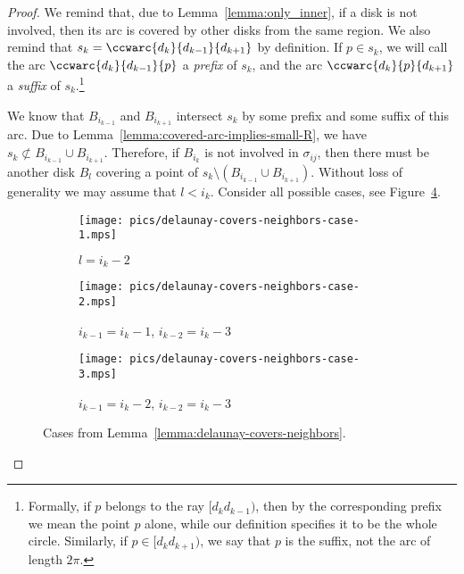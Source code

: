 \begin{appendices}
\begin{proof}
We remind that, due to Lemma~\ref{lemma:only_inner}, if a disk is not involved, then its arc is covered by other disks from the same region. We also remind that $s_k = \ccwarc{d_k}{d_{k-1}}{d_{k+1}}$ by definition. If $p\in s_k$, we will call the arc $\ccwarc{d_k}{d_{k-1}}{p}$ a \emph{prefix} of $s_k$, and the arc $\ccwarc{d_k}{p}{d_{k+1}}$ a \emph{suffix} of $s_k$.\footnote{Formally, if $p$ belongs to the ray $[d_kd_{k-1})$, then by the corresponding prefix we mean the point $p$ alone, while our definition specifies it to be the whole circle. Similarly, if $p\in[d_kd_{k+1})$, we say that $p$ is the suffix, not the arc of length $2\pi$.}

We know that $B_{i_{k-1}}$ and $B_{i_{k+1}}$ intersect $s_k$ by some prefix and some suffix of this arc.
Due to Lemma~\ref{lemma:covered-arc-implies-small-R}, we have $s_k\not\subset B_{i_{k-1}}\cup B_{i_{k+1}}$.
Therefore, if $B_{i_k}$ is not involved in $\sigma_{ij}$, then there must be another disk $B_l$ covering a point of $s_k\setminus(B_{i_{k-1}}\cup B_{i_{k+1}})$. Without loss of generality we may assume that $l < i_k$. Consider all possible cases, see Figure~\ref{fig:delaunay-covers-neighbors-cases}.

\begin{figure}[h!]
    \centering
    \begin{subfigure}[t]{.26\textwidth}
    \texttt{[image: pics/delaunay-covers-neighbors-case-1.mps]}
    \caption{$l = i_k - 2$}
    \label{fig:delaunay-covers-neighbors-case-a}
    \end{subfigure}
    \begin{subfigure}[t]{.35\textwidth}
    \texttt{[image: pics/delaunay-covers-neighbors-case-2.mps]}
    \caption{$i_{k-1} = i_k - 1$, $i_{k-2} = i_k - 3$}
    \label{fig:delaunay-covers-neighbors-case-b}
    \end{subfigure}
    \begin{subfigure}[t]{.35\textwidth}
    \texttt{[image: pics/delaunay-covers-neighbors-case-3.mps]}
    \caption{$i_{k-1} = i_k - 2$, $i_{k-2} = i_k - 3$}
    \label{fig:delaunay-covers-neighbors-case-c}
    \end{subfigure}
    \caption{Cases from Lemma~\ref{lemma:delaunay-covers-neighbors}.}
    \label{fig:delaunay-covers-neighbors-cases}
\end{figure}


\end{proof}
\end{appendices}

